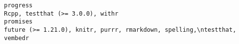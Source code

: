 \documentclass[
  letterpaper,
  DIV=11,
  numbers=noendperiod]{scrreprt}
\begin{document}
\begin{verbatim}
progress                                                                                                                                                                                                                                                                                                                                                                                                                                                                                                                                                                                                                                                                                                                                                                                                                                                                                                                                                                                                                                                                                                                                                                                                                                                                     Rcpp, testthat (>= 3.0.0), withr
promises                                                                                                                                                                                                                                                                                                                                                                                                                                                                                                                                                                                                                                                                                                                                                                                                                                                                                                                                                                                                                                                                                                                                                                                                                            future (>= 1.21.0), knitr, purrr, rmarkdown, spelling,\ntestthat, vembedr

\end{verbatim}
\end{document}

